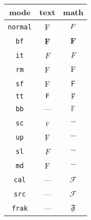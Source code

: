 \documentclass{standalone}
\begin{document}
\begin{tabular}{ccc}
\toprule
mode & text & math \\
\midrule
\verb|normal| & \textnormal{F}  & $\mathnormal{F}$ \\
\verb|bf|     & \textbf{F}      & $\mathbf{F}$     \\
\verb|it|     & \textit{F}      & $\mathit{F}$     \\
\verb|rm|     & \textrm{F}      & $\mathrm{F}$     \\
\verb|sf|     & \textsf{F}      & $\mathsf{F}$     \\
\verb|tt|     & \texttt{F}      & $\mathtt{F}$     \\
\verb|bb|     & ---             & $\mathbb{F}$     \\
\verb|sc|     & \textsc{f}      & $-$              \\
\verb|up|     & \textup{F}      & $-$              \\
\verb|sl|     & \textsl{F}      & $-$              \\
\verb|md|     & \textmd{F}      & $-$              \\
\verb|cal|    & ---             & $\mathcal{F}$    \\
\verb|src|    & ---             & $\mathscr{F}$    \\
\verb|frak|   & ---             & $\mathfrak{F}$   \\
\bottomrule
\end{tabular}

\end{document}
